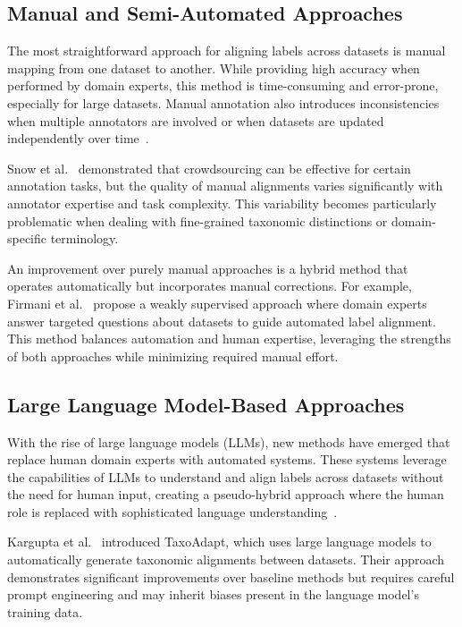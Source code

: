 \subsection{Manual and Semi-Automated Approaches}

The most straightforward approach for aligning labels across datasets is manual mapping
from one dataset to another. While providing high accuracy when performed by domain experts,
this method is time-consuming and error-prone, especially for large datasets. Manual annotation
also introduces inconsistencies when multiple annotators are involved or when datasets
are updated independently over time~\cite{bordea_semeval-2016_2016,jurgens_semeval-2016_2016,yang_literature-driven_2013}.

Snow et al.~\cite{snow_cheap_2008} demonstrated that crowdsourcing can be effective for
certain annotation tasks, but the quality of manual alignments varies significantly with
annotator expertise and task complexity. This variability becomes particularly
problematic when dealing with fine-grained taxonomic distinctions or domain-specific
terminology.

An improvement over purely manual approaches is a hybrid method that operates
automatically but incorporates manual corrections. For example, Firmani et
al.~\cite{firmani_building_2024} propose a weakly supervised approach where domain
experts answer targeted questions about datasets to guide automated label
alignment. This method balances automation and human expertise,
leveraging the strengths of both approaches while minimizing required manual effort.

\subsection{Large Language Model-Based Approaches}

With the rise of large language models (LLMs), new methods have emerged that replace
human domain experts with automated systems. These systems leverage the capabilities of
LLMs to understand and align labels across datasets without the need for human input,
creating a pseudo-hybrid approach where the human role is replaced with sophisticated
language understanding~\cite{kargupta_taxoadapt_2025,chen_prompting_2023,gunn_creating_2024}.

Kargupta et al.~\cite{kargupta_taxoadapt_2025} introduced TaxoAdapt, which uses large
language models to automatically generate taxonomic alignments between datasets. Their
approach demonstrates significant improvements over baseline methods but requires careful
prompt engineering and may inherit biases present in the language model's training data.

